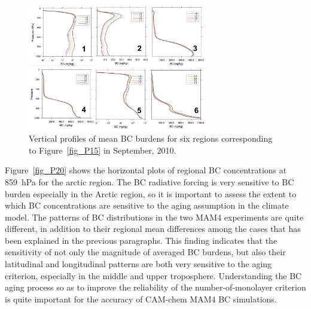 \documentclass[12pt, fullpage]{uiucthesis2009}
\begin{document}
	
	\begin{figure}[h] 
		\begin{center}
			\includegraphics[width = 0.7\textwidth]{Figure16}
			\caption[Vertical profiles of mean BC burdens for six regions corresponding to Figure~\ref{fig_P15} in September, 2010]{\label{fig_P16} Vertical profiles of mean BC burdens for six regions corresponding to Figure~\ref{fig_P15} in September, 2010.}
		\end{center}
	\end{figure}
	
	
	Figure~\ref{fig_P20} shows the horizontal plots of regional BC concentrations at 859~hPa for the arctic region. The BC radiative forcing is very sensitive to BC burden especially in the Arctic region, so it is important to assess the extent to which BC concentrations are sensitive to the aging assumption in the climate model. The patterns of BC distributions in the two MAM4 experiments are quite different, in addition to their regional mean differences among the cases that has been explained in the previous paragraphs. This finding indicates that the sensitivity of not only the magnitude of averaged BC burdens, but also their latitudinal and longitudinal patterns are both very sensitive to the aging criterion, especially in the middle and upper troposphere. Understanding the BC aging process so as to improve the reliability of the number-of-monolayer criterion is quite important for the accuracy of CAM-chem MAM4 BC simulations.
	
\end{document}
